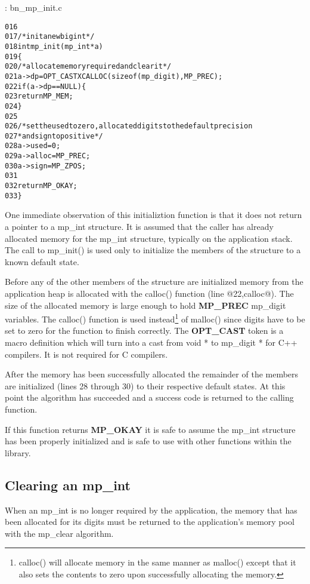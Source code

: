 \documentclass[b5paper]{book}
\begin{document}
\vspace{+3mm}\begin{small}
\hspace{-5.1mm}{\bf File}: bn\_mp\_init.c
\vspace{-3mm}
\begin{alltt}
016   
017   /* init a new bigint */
018   int mp_init (mp_int * a)
019   \{
020     /* allocate memory required and clear it */
021     a->dp = OPT_CAST XCALLOC (sizeof (mp_digit), MP_PREC);
022     if (a->dp == NULL) \{
023       return MP_MEM;
024     \}
025   
026     /* set the used to zero, allocated digits to the default precision
027      * and sign to positive */
028     a->used  = 0;
029     a->alloc = MP_PREC;
030     a->sign  = MP_ZPOS;
031   
032     return MP_OKAY;
033   \}
\end{alltt}
\end{small}

One immediate observation of this initializtion function is that it does not return a pointer to a mp\_int structure.  It 
is assumed that the caller has already allocated memory for the mp\_int structure, typically on the application stack.  The 
call to mp\_init() is used only to initialize the members of the structure to a known default state.  

Before any of the other members of the structure are initialized memory from the application heap is allocated with
the calloc() function (line @22,calloc@).  The size of the allocated memory is large enough to hold \textbf{MP\_PREC} 
mp\_digit variables.  The calloc() function is used instead\footnote{calloc() will allocate memory in the same
manner as malloc() except that it also sets the contents to zero upon successfully allocating the memory.} of malloc() 
since digits have to be set to zero for the function to finish correctly.  The \textbf{OPT\_CAST} token is a macro 
definition which will turn into a cast from void * to mp\_digit * for C++ compilers.  It is not required for C compilers.

After the memory has been successfully allocated the remainder of the members are initialized 
(lines 28 through 30) to their respective default states.  At this point the algorithm has succeeded and
a success code is returned to the calling function.

If this function returns \textbf{MP\_OKAY} it is safe to assume the mp\_int structure has been properly initialized and
is safe to use with other functions within the library.  

\subsection{Clearing an mp\_int}
When an mp\_int is no longer required by the application, the memory that has been allocated for its digits must be 
returned to the application's memory pool with the mp\_clear algorithm.
\end{document}
